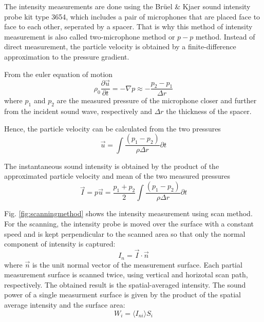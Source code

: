 The intensity measurements are done using the Brüel \& Kjaer sound intensity probe kit type 3654, which includes a pair of microphones that are placed face
to face to each other, seperated by a spacer. That is why this method of intensity measurement is also called two-microphone method or $p-p$ method. Instead of
direct measurement, the particle velocity is obtained by a finite-difference approximation to the pressure gradient. \cite{jocobsen_2005}\cite{moschioni_2008}

From the euler equation of motion
\begin{equation}
    \rho_0 \frac{\partial \Vec{u}}{\partial t} = -\nabla p \approx -\frac{p_2 - p_1}{\Delta r}
\end{equation}
where $p_1$ and $p_2$ are the measured pressure of the microphone closer and further from the incident sound wave, respectively and $\Delta r$ the thickness of the spacer.

Hence, the particle velocity can be calculated from the two pressures
\begin{equation}
    \Vec{u} = \int\frac{(p_1 - p_2)}{\rho \Delta r}\partial t
\end{equation}

The instantaneous sound intensity is obtained by the product of the approximated particle velocity and mean of the two measured pressures
\begin{equation}
    \Vec{I} = p\Vec{u} = \frac{p_1 + p_2}{2} \int\frac{(p_1 - p_2)}{\rho \Delta r}\partial t
\end{equation}

Fig. \ref{fig:scanningmethod} shows the intensity measurement using scan method. For the scanning, the intensity probe is moved over the surface with a constant speed and is kept perpendicular to the scanned area so that only the normal component of intensity is captured:
\begin{equation}
    I_n = \Vec{I} \cdot \Vec{n}
\end{equation}
where $\Vec{n}$ is the unit normal vector of the measurement surface. Each partial measurement surface is scanned twice, using vertical and horizotal scan path, respectively. The obtained result is the spatial-averaged intensity. The sound power of a single measurment surface is given by the product of the spatial average intensity and the surface area:
\begin{equation}
    W_i = \langle I_{ni}\rangle S_i
\end{equation}

